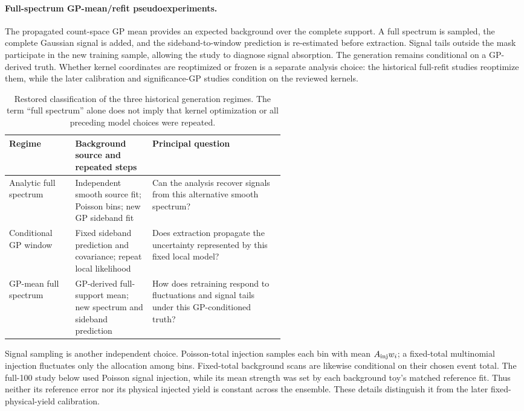 \paragraph{Full-spectrum GP-mean/refit pseudoexperiments.}
The propagated count-space GP mean provides an expected background over
the complete support. A full spectrum is sampled, the complete Gaussian
signal is added, and the sideband-to-window prediction is re-estimated
before extraction. Signal tails outside the mask participate in the
new training sample, allowing the study to diagnose signal absorption.
The generation remains conditional on a GP-derived truth. Whether kernel
coordinates are reoptimized or frozen is a separate analysis choice:
the historical full-refit studies reoptimize them, while the later
calibration and significance-GP studies condition on the reviewed kernels.

\begin{table}[H]\centering\small
\begin{tabularx}{\linewidth}{P{0.24\linewidth}P{0.29\linewidth}Y}
\toprule
Regime & Background source and repeated steps & Principal question\\\midrule
Analytic full spectrum & Independent smooth source fit; Poisson bins;
new GP sideband fit & Can the analysis recover signals from this
alternative smooth spectrum?\\
Conditional GP window & Fixed sideband prediction and covariance;
repeat local likelihood & Does extraction propagate the uncertainty
represented by this fixed local model?\\
GP-mean full spectrum & GP-derived full-support mean; new spectrum
and sideband prediction & How does retraining respond to fluctuations
and signal tails under this GP-conditioned truth?\\\bottomrule
\end{tabularx}
\caption{Restored classification of the three historical generation
regimes. The term ``full spectrum'' alone does not imply that kernel
optimization or all preceding model choices were repeated.}
\label{tab:v501-toy-regimes}
\end{table}

Signal sampling is another independent choice. Poisson-total injection
samples each bin with mean $A_{\rm inj}w_i$; a fixed-total multinomial
injection fluctuates only the allocation among bins. Fixed-total
background scans are likewise conditional on their chosen event total.
The full-100 study below used Poisson signal injection, while its mean
strength was set by each background toy's matched reference fit. Thus
neither its reference error nor its physical injected yield is constant
across the ensemble. These details distinguish it from the later
fixed-physical-yield calibration.

